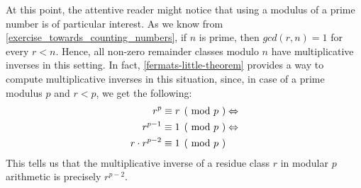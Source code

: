 At this point, the attentive reader might notice that using a modulus of a prime number is of particular interest. As we know from \exercisename{} \ref{exercise_towards_counting_numbers}, if $n$ is prime, then $gcd(r,n)=1$ for every $r<n$. Hence, all non-zero remainder classes modulo $n$ have multiplicative inverses in this setting. In fact,  \eqref{fermats-little-theorem} provides a way to compute multiplicative inverses in this situation, since, in case of a prime modulus $p$ and $r<p$, we get the following:
\begin{align*}
\kongru{r^p}{r}{p} & \Leftrightarrow \\
\kongru{r^{p-1}}{1}{p} & \Leftrightarrow \\
\kongru{r\cdot r^{p-2}}{1}{p}
\end{align*}
This tells us that the multiplicative inverse of a residue class $r$ in modular $p$ arithmetic is precisely $r^{p-2}$.
